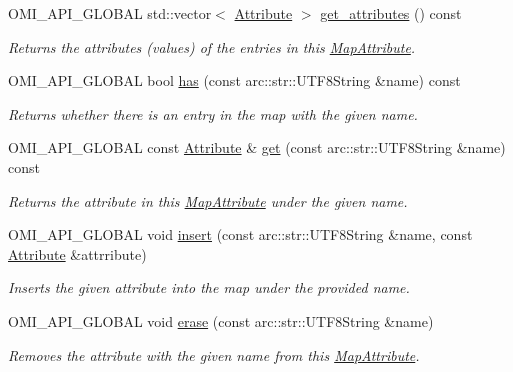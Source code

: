 \begin{DoxyCompactItemize}
O\+M\+I\+\_\+\+A\+P\+I\+\_\+\+G\+L\+O\+B\+AL std\+::vector$<$ \hyperlink{classomi_1_1_attribute}{Attribute} $>$ \hyperlink{classomi_1_1_map_attribute_a600ec6e7edb7fde8529340cb65f3861f}{get\+\_\+attributes} () const 
\begin{DoxyCompactList}\small\item\em Returns the attributes (values) of the entries in this \hyperlink{classomi_1_1_map_attribute}{Map\+Attribute}. \end{DoxyCompactList}\item 
O\+M\+I\+\_\+\+A\+P\+I\+\_\+\+G\+L\+O\+B\+AL bool \hyperlink{classomi_1_1_map_attribute_ac1c6c017c7068f08e1d9fbbe926f171b}{has} (const arc\+::str\+::\+U\+T\+F8\+String \&name) const 
\begin{DoxyCompactList}\small\item\em Returns whether there is an entry in the map with the given name. \end{DoxyCompactList}\item 
O\+M\+I\+\_\+\+A\+P\+I\+\_\+\+G\+L\+O\+B\+AL const \hyperlink{classomi_1_1_attribute}{Attribute} \& \hyperlink{classomi_1_1_map_attribute_a65d78eb8f9b4ab89989c164986ae638b}{get} (const arc\+::str\+::\+U\+T\+F8\+String \&name) const 
\begin{DoxyCompactList}\small\item\em Returns the attribute in this \hyperlink{classomi_1_1_map_attribute}{Map\+Attribute} under the given name. \end{DoxyCompactList}\item 
O\+M\+I\+\_\+\+A\+P\+I\+\_\+\+G\+L\+O\+B\+AL void \hyperlink{classomi_1_1_map_attribute_a38565aee85f4bdb82792aa368b459e95}{insert} (const arc\+::str\+::\+U\+T\+F8\+String \&name, const \hyperlink{classomi_1_1_attribute}{Attribute} \&attrribute)
\begin{DoxyCompactList}\small\item\em Inserts the given attribute into the map under the provided name. \end{DoxyCompactList}\item 
O\+M\+I\+\_\+\+A\+P\+I\+\_\+\+G\+L\+O\+B\+AL void \hyperlink{classomi_1_1_map_attribute_abed8fa17cdd3ce28b95471c947f3701d}{erase} (const arc\+::str\+::\+U\+T\+F8\+String \&name)
\begin{DoxyCompactList}\small\item\em Removes the attribute with the given name from this \hyperlink{classomi_1_1_map_attribute}{Map\+Attribute}. \end{DoxyCompactList}\item 

\end{DoxyCompactItemize}
